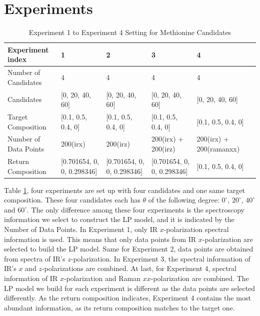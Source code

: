 \section{Experiments}
\begin{table}\tiny 
\begin{tabular}{| l | l | l | l | l | l }
\hline
Experiment index & 1 & 2 & 3 & 4 \\
\hline
Number of Candidates & 4 & 4 & 4 & 4 \\
\hline
Candidates & [0, 20, 40, 60] & [0, 20, 40, 60] & [0, 20, 40, 60] & [0, 20, 40, 60]\\
\hline
Target Composition & [0.1, 0.5, 0.4, 0] & [0.1, 0.5, 0.4, 0] & [0.1, 0.5, 0.4, 0] & [0.1, 0.5, 0.4, 0]\\
\hline
Number of Data Points & 200(irx) & 200(irz) & 200(irx) + 200(irz) & 200(irx) + 200(ramanxx)\\
\hline
Return Composition & [0.701654, 0, 0, 0.298346] & [0.701654, 0, 0, 0.298346] & [0.701654, 0, 0, 0.298346] & [0.1, 0.5, 0.4, 0]\\
\hline
\end{tabular} 
\caption{Experiment 1 to Experiment 4 Setting for Methionine Candidates} 
\label{tab:4.1}
\end{table}	

Table \ref{tab:4.1}, four experiments are set up with four candidates and one same target composition. These four candidates each has $\theta$ of the following degree: $0^{\circ}$, $20^{\circ}$, $40^{\circ}$ and $60^{\circ}$. The only difference among these four experiments is the spectroscopy information we select to construct the LP model, and it is indicated by the Number of Data Points. In Experiment 1, only IR $x$-polarization spectral information is used. This means that only data points from IR $x$-polarization are selected to build the LP model. Same for Experiment 2, data points are obtained from spectra of IR's $z$-polarization. In Experiment 3, the spectral information of IR's $x$ and $z$-polarizations are combined. At last, for Experiment 4, spectral information of IR $x$-polarization and Raman $xx$-polarization are combined. The LP model we build for each experiment is different as the data points are selected differently. As the return composition indicates, 
Experiment 4 contains the most abundant information, as its return composition matches to the target one. \\

